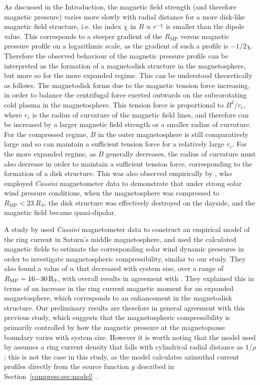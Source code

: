 As discussed in the Introduction, the magnetic field strength (and therefore magnetic pressure) varies more slowly with radial distance for a more disk-like magnetic field structure, i.e. the index $\chi$ in $B \propto r^{-\chi}$ is smaller than the dipole value. This corresponds to a steeper gradient of the $R_\mathrm{MP}$ versus magnetic pressure profile on a logarithmic scale, as the gradient of such a profile is $-1/2\chi$. Therefore the observed behaviour of the magnetic pressure profile can be interpreted as the formation of a magnetodisk structure in the magnetosphere, but more so for the more expanded regime. This can be understood theoretically as follows. The magnetodisk forms due to the magnetic tension force increasing, in order to balance the centrifugal force exerted outwards on the subcorotating cold plasma in the magnetosphere. This tension force is proportional to $B^2/r_c$, where $r_c$ is the radius of curvature of the magnetic field lines, and therefore can be increased by a larger magnetic field strength or a smaller radius of curvature. For the compressed regime, $B$ in the outer magnetosphere is still comparatively large and so can maintain a sufficient tension force for a relatively large $r_c$. For the more expanded regime, as $B$ generally decreases, the radius of curvature must also decrease in order to maintain a sufficient tension force, corresponding to the formation of a disk structure. This was also observed empirically by \citet{arridge2008}, who employed \textit{Cassini} magnetometer data to demonstrate that under strong solar wind pressure conditions, when the magnetosphere was compressed to $R_\mathrm{MP} < \SI{23}{R_S}$, the disk structure was effectively destroyed on the dayside, and the magnetic field became quasi-dipolar.

A study by \citet{bunce2007} used \textit{Cassini} magnetometer data to construct an empirical model of the ring current in Saturn's middle magnetosphere, and used the calculated magnetic fields to estimate the corresponding solar wind dynamic pressures in order to investigate magnetospheric compressibility, similar to our study. They also found a value of $\alpha$ that decreased with system size, over a range of $R_\mathrm{MP} = 16{\--}\SI{30}{R_S}$, with overall results in agreement with \citet{arridge2006}. They explained this in terms of an increase in the ring current magnetic moment for an expanded magnetosphere, which corresponds to an enhancement in the magnetodisk structure. Our preliminary results are therefore in general agreement with this previous study, which suggests that the magnetospheric compressibility is primarily controlled by how the magnetic pressure at the magnetopause boundary varies with system size. However it is worth noting that the model used by \citet{bunce2007} assumes a ring current density that falls with cylindrical radial distance as $1/\rho$; this is not the case in this study, as the \citet{achilleos2010a} model calculates azimuthal current profiles directly from the source function $g$ described in Section~\ref{compress:sec:model} \cite[see][]{caudal1986, achilleos2010a}.

